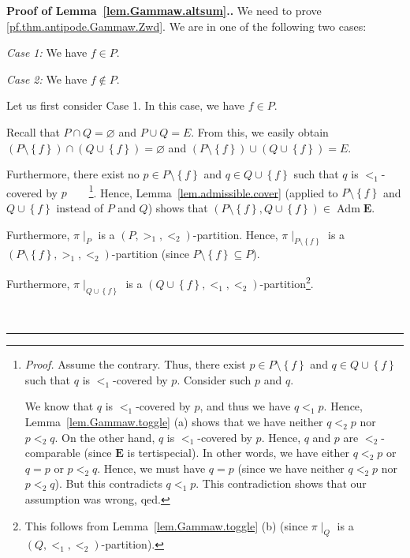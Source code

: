 \documentclass[numbers=enddot,12pt,final,onecolumn,notitlepage,abstracton]{scrartcl}
\theoremstyle{definition}
\newenvironment{proof}[1][Proof]{\noindent\textbf{#1.} }{\ \rule{0.5em}{0.5em}}
\newcommand{\Adm}{\operatorname{Adm}}
\newcommand{\EE}{{\mathbf{E}}}
\begin{document}
\begin{proof}[Proof of Lemma~\ref{lem.Gammaw.altsum}.]
We need to prove \eqref{pf.thm.antipode.Gammaw.Zwd}. We are in one of the
following two cases:

\textit{Case 1:} We have $f\in P$.

\textit{Case 2:} We have $f\notin P$.

Let us first consider Case 1. In this case, we have $f\in P$.

Recall that $P\cap Q=\varnothing$ and $P\cup Q=E$. From this, we easily obtain
$\left(  P\setminus\left\{  f\right\}  \right)  \cap\left(  Q\cup\left\{
f\right\}  \right)  =\varnothing$ and $\left(  P\setminus\left\{  f\right\}
\right)  \cup\left(  Q\cup\left\{  f\right\}  \right)  =E$.

Furthermore, there exist no $p\in P\setminus\left\{  f\right\}  $ and $q\in
Q\cup\left\{  f\right\}  $ such that $q$ is $<_{1}$-covered by
$p$\ \ \ \ \footnote{\textit{Proof.}
Assume the contrary. Thus, there exist $p\in
P\setminus\left\{  f\right\}  $ and $q\in Q\cup\left\{  f\right\}  $ such that
$q$ is $<_{1}$-covered by $p$. Consider such $p$ and $q$.
\par
We know that $q$ is $<_{1}$-covered by $p$, and thus we have $q<_{1}p$.
Hence, Lemma~\ref{lem.Gammaw.toggle} (a) shows that
we have neither $q <_2 p$ nor $p <_2 q$.
On the other hand,
$q$ is $<_{1}$-covered by $p$. Hence, $q$ and $p$ are
$<_{2}$-comparable (since $\EE$ is tertispecial).
In other words, we have either $q <_2 p$ or $q = p$ or $p <_2 q$.
Hence, we must have $q = p$ (since we have neither $q <_2 p$
nor $p <_2 q$). But this contradicts $q <_1 p$.
This contradiction shows that our
assumption was wrong, qed.}. Hence, Lemma~\ref{lem.admissible.cover} (applied
to $P\setminus\left\{  f\right\}  $ and $Q\cup\left\{  f\right\}  $ instead of
$P$ and $Q$) shows that $\left(  P\setminus\left\{  f\right\}  ,Q\cup\left\{
f\right\}  \right)  \in \Adm \EE$.

Furthermore, $\pi\mid_{P}$ is a $\left(  P,>_{1},<_{2}\right)  $-partition.
Hence, $\pi\mid_{P\setminus\left\{  f\right\}  }$ is a $\left(
P\setminus\left\{  f\right\}  ,>_{1},<_{2}\right)  $-partition (since
$P\setminus\left\{  f\right\}  \subseteq P$).

Furthermore, $\pi\mid_{Q\cup\left\{  f\right\}  }$ is a $\left(  Q\cup\left\{
f\right\}  ,<_{1},<_{2}\right)  $-partition\footnote{This follows from
Lemma~\ref{lem.Gammaw.toggle} (b) (since $\pi\mid_Q$ is a
$\left(Q, <_1, <_2\right)$-partition).}.


\end{proof}
\end{document}
